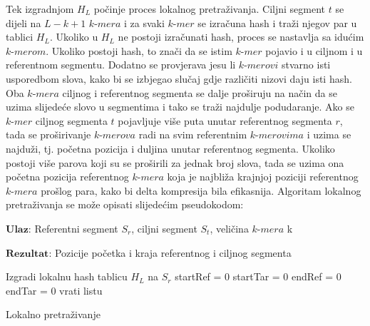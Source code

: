 \documentclass[times, utf8, diplomski]{fer}
\begin{document}
Tek izgradnjom $\textit{H}_L$ počinje proces lokalnog pretraživanja. Ciljni segment $t$ se dijeli na $L - k + 1$ $\textit{k-mera}$ i za svaki $\textit{k-mer}$ se izračuna hash i traži njegov par u tablici $\textit{H}_L$. Ukoliko u $\textit{H}_L$ ne postoji izračunati hash, proces se nastavlja sa idućim $\textit{k-merom}$. Ukoliko postoji hash, to znači da se istim $\textit{k-mer}$ pojavio i u ciljnom i u referentnom segmentu. Dodatno se provjerava jesu li $\textit{k-merovi}$ stvarno isti usporedbom slova, kako bi se izbjegao slučaj gdje različiti nizovi daju isti hash. Oba $\textit{k-mera}$ ciljnog i referentnog segmenta se dalje proširuju na način da se uzima slijedeće slovo u segmentima i tako se traži najdulje podudaranje. Ako se $\textit{k-mer}$ ciljnog segmenta $t$ pojavljuje više puta unutar referentnog segmenta $r$, tada se proširivanje $\textit{k-merova}$ radi na svim referentnim $\textit{k-merovima}$ i uzima se najduži, tj. početna pozicija i duljina unutar referentnog segmenta. Ukoliko postoji više parova koji su se proširili za jednak broj slova, tada se uzima ona početna pozicija referentnog $\textit{k-mera}$ koja je najbliža krajnjoj poziciji referentnog $\textit{k-mera}$ prošlog para, kako bi delta kompresija bila efikasnija. Algoritam lokalnog pretraživanja se može opisati slijedećim pseudokodom:\\
\begin{algorithm} [H]
\SetAlgoLined
$\textbf{Ulaz}$: Referentni segment $\textit{S}_r$, ciljni segment $\textit{S}_t$, veličina $\textit{k-mera}$ k

$\textbf{Rezultat}$: Pozicije početka i kraja referentnog i ciljnog segmenta

Izgradi lokalnu hash tablicu $\textit{H}_L$ na $\textit{S}_r$\;
startRef = 0\;
startTar = 0\;
endRef = 0\;
endTar = 0\;
vrati listu\;
\caption{Lokalno pretraživanje}
\end{algorithm}
\end{document}
